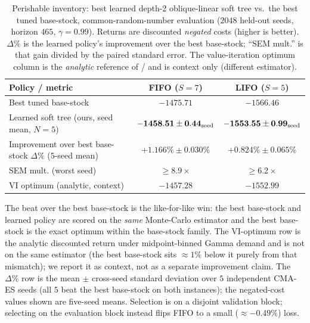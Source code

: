 \documentclass[11pt]{article}
\begin{document}
\begin{table}[!htbp]
\centering
\small
\caption{Perishable inventory: best learned depth-2 oblique-linear soft tree vs.\ the best tuned base-stock,
common-random-number evaluation ($2048$ held-out seeds, horizon $465$, $\gamma=0.99$). Returns
are discounted \emph{negated} costs (higher is better). $\Delta\%$ is the learned policy's improvement
over the best base-stock; ``SEM mult.'' is that gain divided by the paired standard error. The value-iteration
optimum column is the \emph{analytic} reference of \citet{deMoor2022perishable} /
\citet{farrington2025perishable} and is context only (different estimator).}
\label{tab:perish-results}
\begin{tabular}{lcc}
\toprule
Policy / metric & FIFO ($S=7$) & LIFO ($S=5$) \\
\midrule
Best tuned base-stock & $-1475.71$ & $-1566.46$ \\
Learned soft tree (ours, seed mean, $N=5$) & $\mathbf{-1458.51\pm0.44_{\rm seed}}$ & $\mathbf{-1553.55\pm0.99_{\rm seed}}$ \\
Improvement over best base-stock $\Delta\%$ ($5$-seed mean) & $\mathbf{+1.166\%\pm0.030\%}$ & $\mathbf{+0.824\%\pm0.065\%}$ \\
SEM mult. (worst seed) & $\ge 8.9\times$ & $\ge 6.2\times$ \\
\midrule
VI optimum (analytic, context) & $-1457.28$ & $-1552.99$ \\
\bottomrule
\end{tabular}
\par\medskip\footnotesize The beat over the best base-stock is the like-for-like win: the best base-stock and learned policy are scored on
the \emph{same} Monte-Carlo estimator and the best base-stock is the exact optimum within the base-stock family.
The VI-optimum row is the analytic discounted return under midpoint-binned Gamma demand and is not
on the same estimator (the best base-stock sits $\approx1\%$ below it purely from that mismatch); we report it
as context, not as a separate improvement claim. The $\Delta\%$ row is the mean $\pm$ cross-seed
standard deviation over $5$ independent CMA-ES seeds (all $5$ beat the best base-stock on both instances);
the negated-cost values shown are five-seed means. Selection is on a disjoint validation block;
selecting on the evaluation block instead flips FIFO to a small ($\approx-0.49\%$) loss.
\end{table}
\FloatBarrier
\end{document}
